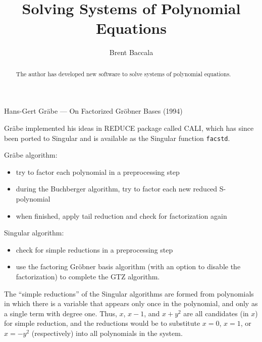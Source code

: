 \documentclass{article}
\title{Solving Systems of Polynomial Equations}
\author{Brent Baccala}
\begin{document}
\parindent 0pt

\maketitle

\begin{abstract}
The author has developed new software to solve systems of polynomial equations.
\end{abstract}


\parskip 12pt


Hans-Gert Gr\"abe --- On Factorized Gr\"obner Bases (1994)

Gr\"abe implemented his ideas in REDUCE package called CALI, which has since been ported
to Singular and is available as the Singular function {\tt facstd}.

Gr\"abe algorithm:

\begin{itemize}
\item try to factor each polynomial in a preprocessing step
\item during the Buchberger algorithm, try to factor each new reduced S-polynomial
\item when finished, apply tail reduction and check for factorization again
\end{itemize}

Singular algorithm:

\begin{itemize}
\item check for simple reductions in a preprocessing step
\item use the factoring Gr\"obner basis algorithm (with an option to disable the factorization) to complete the GTZ algorithm.
\end{itemize}

The ``simple reductions'' of the Singular algorithms are formed from polynomials in which
there is a variable that appears only once in the polynomial, and only as a single term with degree one.
Thus, $x$, $x-1$, and $x+y^2$ are all candidates (in $x$) for simple reduction, and
the reductions would be to substitute $x=0$, $x=1$, or $x=-y^2$ (respectively) into all
polynomials in the system.
\end{document}
